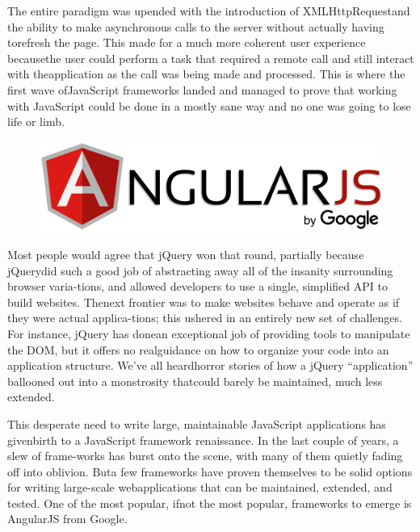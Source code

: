 The  entire  paradigm  was  upended  with  the  introduction  of  XMLHttpRequestand the ability to make asynchronous calls to the server without actually having torefresh  the  page. This  made  for  a  much  more  coherent  user  experience  becausethe user could perform a task that required a remote call and still interact with theapplication as the call was being made and processed. This is where the first wave ofJavaScript frameworks landed and managed to prove that working with JavaScript could be done in a mostly sane way and no one was going to lose life or limb.
\newline
\begin{figure}[h]
		\centering
		\includegraphics[width=0.7\linewidth]{images/angular}
		\label{fig:angular-logo}
\end{figure}
Most  people  would  agree  that  jQuery  won  that  round,  partially  because  jQuerydid such a good job of abstracting away all of the insanity surrounding browser varia-tions,  and  allowed  developers  to  use  a  single,  simplified  API  to  build  websites.  Thenext frontier was to make websites behave and operate as if they were actual applica-tions; this ushered in an entirely new set of challenges. For instance, jQuery has donean  exceptional  job  of  providing  tools  to  manipulate  the  DOM,  but  it  offers  no  realguidance on how to organize your code into an application structure. We’ve all heardhorror  stories  of  how  a  jQuery  “application”  ballooned  out  into  a  monstrosity  thatcould barely be maintained, much less extended.
\newline

This desperate need to write large, maintainable JavaScript applications has givenbirth to a JavaScript framework renaissance. In the last couple of years, a slew of frame-works has burst onto the scene, with many of them quietly fading off into oblivion. Buta few frameworks have proven themselves to be solid options for writing large-scale webapplications that can be maintained, extended, and tested. One of the most popular, ifnot the most popular, frameworks to emerge is AngularJS from Google.
\newline

